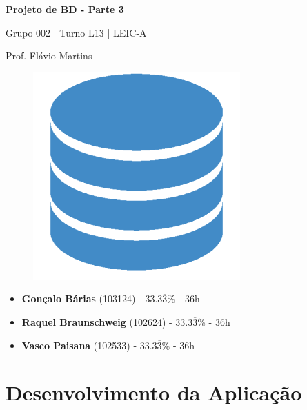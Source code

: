 \documentclass[12pt,a4paper]{article}
\begin{document}
\begin{titlepage}
  \begin{center}
    \vspace*{5cm}
    \Huge
    \textbf{Projeto de BD - Parte 3}

    \vspace{0.5cm}
    \LARGE
    Grupo 002 | Turno L13 | LEIC-A

    \vspace{0.5cm}
    \large
    Prof. Flávio Martins

    \vspace{0.5cm}
    \begin{figure}[h]
      \centering
      \includegraphics[scale=0.5]{report_logo.png}
    \end{figure}

    \vfill
    \large
    \begin{minipage}{0.8\textwidth}
      \begin{itemize}
        \item[] \textbf{Gonçalo Bárias} (103124) - 33.3$\overline{3}$\% - 36h
        \item[] \textbf{Raquel Braunschweig} (102624) - 33.3$\overline{3}$\% - 36h
        \item[] \textbf{Vasco Paisana} (102533) - 33.3$\overline{3}$\% - 36h
      \end{itemize}
    \end{minipage}
  \end{center}
\end{titlepage}

\section*{Desenvolvimento da Aplicação}
\end{document}
